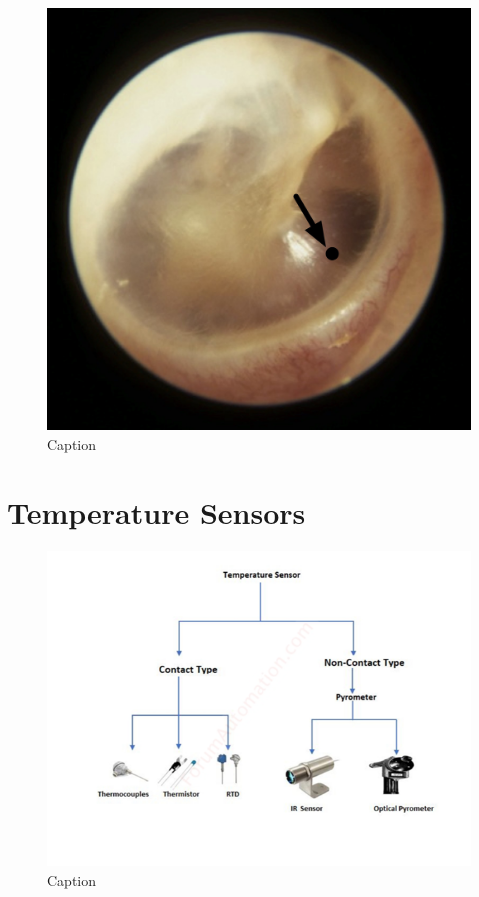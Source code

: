 \begin{figure}[t]
    \centering
    \includegraphics[scale=0.15]{thesis-doc/images/tympanic_membrane_mp.png}
    \caption{Caption}
    \label{fig:tympanic_membrane_mp}
\end{figure}


\section{Temperature Sensors}
\label{Background:TemperatureSensors}
\begin{figure}[t]
    \centering
    \includegraphics[scale=0.7]{thesis-doc/images/introduction/temp_sensor_types.png}
    \caption{Caption}
    \label{fig:temperature_sensors}
\end{figure}

